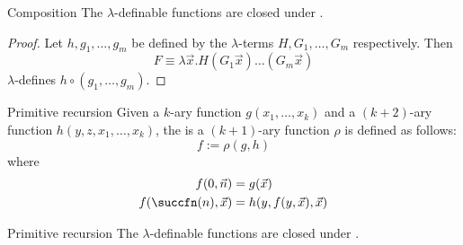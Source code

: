 \documentclass[a4paper, 12pt]{report}
\begin{document}
    \begin{framedlem}[label={lem:composition}]{Composition}
        The $\lambda$-definable functions are closed under .
    \end{framedlem}

    \begin{proof}
        Let $h, g_1, \ldots, g_m$ be defined by the $\lambda$-terms $H, G_1, \ldots, G_m$ respectively. Then $$F \equiv \lambda \vec x. H(G_1\vec x) \ldots (G_m \vec x)$$ $\lambda$-defines $h \circ (g_1, \ldots, g_m)$.
    \end{proof}
    
    \begin{frameddefn}{Primitive recursion}
        Given a $k$-ary function $g(x_1, \ldots, x_k)$ and a $(k + 2)$-ary function $h(y, z, x_1, \ldots, x_k)$, the  is a $(k + 1)$-ary function $\rho$ is defined as follows: $$f := \rho (g, h)$$ where
        \begin{equation*}
            \begin{split}
                f(0, \vec n) &= g(\vec x) \\
                f(\succfn(n), \vec x) &= h(y, f(y, \vec x), \vec x)
            \end{split}
        \end{equation*}
    \end{frameddefn}
    
    \begin{framedlem}[label={lem:prim_rec}]{Primitive recursion}
        The $\lambda$-definable functions are closed under .
    \end{framedlem}
\end{document}
